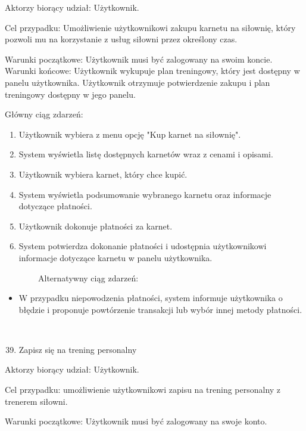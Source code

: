 {Aktorzy biorący udział: Użytkownik.}

{Cel przypadku: Umożliwienie użytkownikowi zakupu karnetu na siłownię,
który pozwoli mu na korzystanie z usług siłowni przez określony czas.}

{Warunki początkowe: Użytkownik musi być zalogowany na swoim koncie.\\
Warunki końcowe: Użytkownik wykupuje plan treningowy, który jest
dostępny w panelu użytkownika. Użytkownik otrzymuje potwierdzenie zakupu
i plan treningowy dostępny w jego panelu.}

{Główny ciąg zdarzeń:}

\begin{enumerate}
\tightlist
\item
  {Użytkownik wybiera z menu opcję "Kup karnet na siłownię".}
\item
  {System wyświetla listę dostępnych karnetów wraz z cenami i opisami.}
\item
  {Użytkownik wybiera karnet, który chce kupić.}
\item
  {System wyświetla podsumowanie wybranego karnetu oraz informacje
  dotyczące płatności.}
\item
  {Użytkownik dokonuje płatności za karnet.}
\item
  {System potwierdza dokonanie płatności i udostępnia użytkownikowi
  informacje dotyczące karnetu w panelu użytkownika.}
\end{enumerate}

{~~~~~~~~Alternatywny ciąg zdarzeń:}

\begin{itemize}
\tightlist
\item
  {W przypadku niepowodzenia płatności, system informuje użytkownika o
  błędzie i proponuje powtórzenie transakcji lub wybór innej metody
  płatności.\\
  \strut \\
  }
\end{itemize}

\begin{enumerate}
\setcounter{enumi}{38}
\tightlist
\item
  {Zapisz się na trening personalny}
\end{enumerate}

{Aktorzy biorący udział: Użytkownik.}

{Cel przypadku: umożliwienie użytkownikowi zapisu na trening personalny
z trenerem siłowni.}

{Warunki początkowe: Użytkownik musi być zalogowany na swoje konto.}

